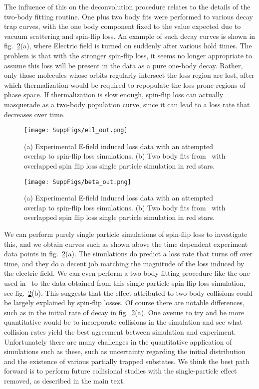 \documentclass[%
 reprint,
 amsmath,amssymb,
 aps,
prl,
]{revtex4-1}
\begin{document}
The influence of this on the deconvolution procedure relates to the details of the two-body fitting routine.
One plus two body fits were performed to various decay trap curves, with the one body component fixed to the value expected due to vacuum scattering and spin-flip loss.
An example of  such decay curves is shown in fig.~\ref{fig:eil}(a), where Electric field is turned on suddenly after various hold times.
The problem is that with the stronger spin-flip loss, it seems no longer appropriate to assume this loss will be present in the data as a pure one-body decay.
Rather, only those molecules whose orbits regularly intersect the loss region are lost, after which thermalization would be required to repopulate the loss prone regions of phase space. 
If thermalization is slow enough, spin-flip loss can actually masquerade as a two-body population curve, since it can lead to a loss rate that decreases over time.

\begin{figure}[tb]
\texttt{[image: SuppFigs/eil\_out.png]}%
\caption{
(a) Experimental E-field induced loss data with an attempted overlap to spin-flip loss simulations. (b) Two body fits from~\cite{Stuhl2013} with overlapped spin flip loss single particle simulation in red stars.
}
\label{fig:eil}
\end{figure}

\begin{figure}[tb]
\texttt{[image: SuppFigs/beta\_out.png]}%
\caption{
(a) Experimental E-field induced loss data with an attempted overlap to spin-flip loss simulations. (b) Two body fits from~\cite{Stuhl2013} with overlapped spin flip loss single particle simulation in red stars.
}
\label{fig:eil}
\end{figure}



We can perform purely single particle simulations of spin-flip loss to investigate this, and we obtain curves such as shown above the time dependent experiment data points in fig.~\ref{fig:eil}(a).
The simulations do predict a loss rate that turns off over time, and they do a decent job matching the magnitude of the loss induced by the electric field.
We can even perform a two body fitting procedure like the one used in~\cite{Stuhl2013} to the data obtained from this single particle spin-flip loss simulation, see fig.~\ref{fig:eil}(b). 
This suggests that the effect attributed to two-body collisions could be largely explained by spin-flip losses.
Of course there are notable differences, such as in the initial rate of decay in fig.~\ref{fig:eil}(a).
One avenue to try and be more quantitative would be to incorporate collisions in the simulation and see what collision rates yield the best agreement between simulation and experiment.
Unfortunately there are many challenges in the quantitative application of simulations such as these, such as uncertainty regarding the initial distribution and the existence of various partially trapped substates.
We think the best path forward is to perform future collisional studies with the single-particle effect removed, as described in the main text.
\end{document}
